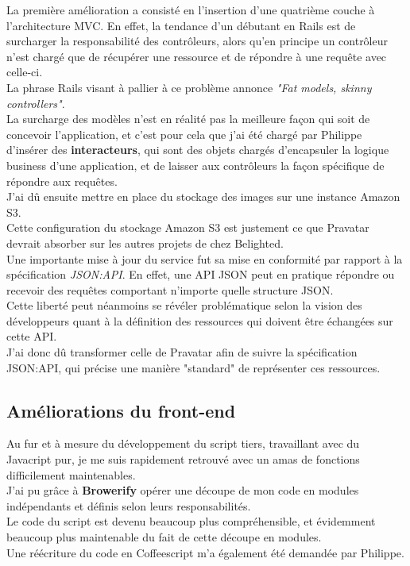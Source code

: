 \documentclass{report}
\begin{document}
      La première amélioration a consisté en l'insertion d'une quatrième couche à l'architecture MVC. En effet, la tendance d'un débutant en Rails est de surcharger la responsabilité des contrôleurs, alors qu'en
      principe un contrôleur n'est chargé que de récupérer une ressource et de répondre à une requête avec celle-ci.\\
      La phrase Rails visant à pallier à ce problème annonce \textit{"Fat models, skinny controllers"}.\\
      La surcharge des modèles n'est en réalité pas la meilleure façon qui soit de concevoir l'application, et c'est pour cela que j'ai été chargé par Philippe d'insérer des \textbf{interacteurs}, qui sont des
      objets chargés d'encapsuler la logique business d'une application, et de laisser aux contrôleurs la façon spécifique de répondre aux requêtes.\\

      J'ai dû ensuite mettre en place du stockage des images sur une instance Amazon S3.\\
      Cette configuration du stockage Amazon S3 est justement ce que Pravatar devrait absorber sur les autres projets de chez Belighted.\\

      Une importante mise à jour du service fut sa mise en conformité par rapport à la spécification \textit{JSON:API}. En effet, une API JSON peut en pratique répondre ou recevoir des requêtes
      comportant n'importe quelle structure JSON.\\
      Cette liberté peut néanmoins se révéler problématique selon la vision des développeurs quant à la définition des ressources qui doivent être échangées sur cette API.\\
      J'ai donc dû transformer celle de Pravatar afin de suivre la spécification JSON:API, qui précise une manière "standard" de représenter ces ressources.\\

    \subsection{Améliorations du front-end}
    \label{sub:Améliorations du front-end}

      Au fur et à mesure du développement du script tiers, travaillant avec du Javacript pur, je me suis rapidement retrouvé avec un amas de fonctions difficilement maintenables.\\
      J'ai pu grâce à \textbf{Browerify} opérer une découpe de mon code en modules indépendants et définis selon leurs responsabilités.\\
      Le code du script est devenu beaucoup plus compréhensible, et évidemment beaucoup plus maintenable du fait de cette découpe en modules.\\
      Une réécriture du code en Coffeescript m'a également été demandée par Philippe.
\end{document}
